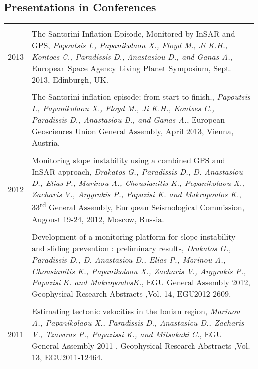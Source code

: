 \documentclass[a4paper,10pt]{article} %
\begin{document}
\subsection*{Presentations in Conferences}

\begin{longtable}{r|p{14cm}}
\multicolumn{2}{c}{} \\ 
  \textsc{2013}
  & The Santorini Inflation Episode, Monitored by InSAR and GPS,
  \emph{Papoutsis I., Papanikolaou X., Floyd M., Ji K.H., Kontoes C., Paradissis D., Anastasiou D., and Ganas A.},
  European Space Agency Living Planet Symposium, Sept. 2013, Edinburgh, UK.\\

  &\\

  & The Santorini inflation episode: from start to finish.,
  \emph{Papoutsis I., Papanikolaou X., Floyd M., Ji K.H., Kontoes C., Paradissis D., Anastasiou D., and Ganas A.},
  European Geosciences Union General Assembly, April 2013, Vienna, Austria.\\

\multicolumn{2}{c}{} \\
  \textsc{2012}
  & Monitoring slope instability using a combined GPS and InSAR approach,
  \emph{Drakatos G., Paradissis D., D. Anastasiou D., Elias P., Marinou A., Chousianitis K., Papanikolaou X., Zacharis V., Argyrakis P., Papazisi K. and Makropoulos K.},
  33\textsuperscript{rd} General Assembly, European Seismological Commission, Augoust 19-24, 2012, Moscow, Russia.\\

  &\\

  & Development of a monitoring platform for slope instability and sliding prevention : preliminary results,
  \emph{Drakatos G., Paradissis D., D. Anastasiou D., Elias P., Marinou A., Chousianitis K., Papanikolaou X., Zacharis V., Argyrakis P., Papazisi K. and MakropoulosK.},
  EGU General Assembly 2012, Geophysical Research Abstracts ,Vol. 14, EGU2012-2609.\\

\multicolumn{2}{c}{} \\
  \textsc{2011}
  & Estimating tectonic velocities in the Ionian region, 
  \emph{Marinou Α., Papanikolaou X., Paradissis D., Anastasiou D., Zacharis V., Tzavaras P., Papazissi K., and Mitsakaki C.},
  EGU General Assembly 2011 , Geophysical Research Abstracts ,Vol. 13, EGU2011-12464.\\


\end{longtable}
\end{document}
